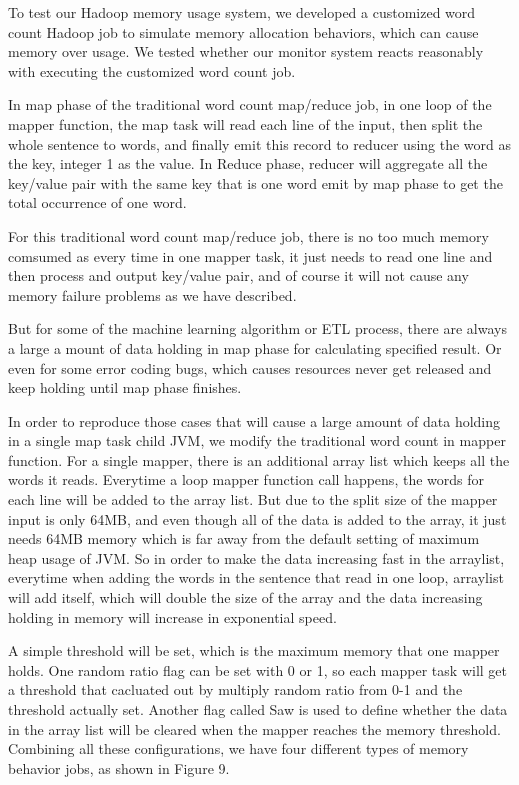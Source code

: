 To test our Hadoop memory usage system, we developed a customized word count Hadoop job to simulate memory allocation behaviors, which can cause memory over usage. We tested whether our monitor system reacts reasonably with executing the customized word count job.  

In map phase of the traditional word count map/reduce job, in one loop of the mapper function, the map task will read each line of the input, then split the whole sentence to words, and finally emit this record to reducer using the word as the key, integer 1 as the value. In Reduce phase, reducer will aggregate all the key/value pair with the same key that is one word emit by map phase to get the total occurrence of one word.

For this traditional word count map/reduce job, there is no too much memory comsumed as every time in one mapper task, it just needs to read one line and then process and output key/value pair, and of course it will not cause any memory failure problems as we have described.

But for some of the machine learning algorithm or ETL process, there are always a large a mount of data holding in map phase for calculating specified result. Or even for some error coding bugs, which causes resources never get released and keep holding until map phase finishes.

In order to reproduce those cases that will cause a large amount of data holding in a single map task child JVM, we modify the traditional word count in mapper function. For a single mapper, there is an additional array list which keeps all the words it reads. Everytime a loop mapper function call happens, the words for each line will be added to the array list. But due to the split size of the mapper input is only 64MB, and even though all of the data is added to the array, it just needs 64MB memory which is far away from the default setting of maximum heap usage of JVM. So in order to make the data increasing fast in the arraylist, everytime when adding the words in the sentence that read in one loop, arraylist will add itself, which will double the size of the array and the data increasing holding in memory will increase in exponential speed.

A simple threshold will be set, which is the maximum memory that one mapper holds. One random ratio flag can be set with 0 or 1, so each mapper task will get a threshold that cacluated out by multiply random ratio from 0-1 and the threshold actually set. Another flag called Saw is used to define whether the data in the array list will be cleared when the mapper reaches the memory threshold. Combining all these configurations, we have four different types of memory behavior jobs, as shown in Figure 9.


